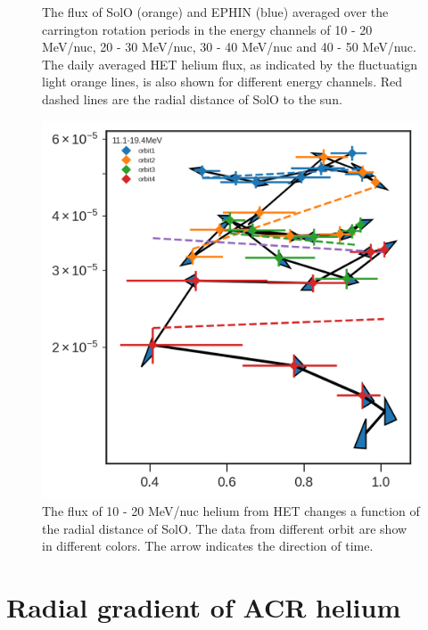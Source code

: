 \begin{figure}
    \caption[The helium flux averaged over the the carrington rotation periods in four energy channels between 10 and 50 MeV/nuc]{The flux of \ac{SolO} (orange) and \ac{EPHIN} (blue) averaged over the carrington rotation periods in the energy channels of 10 - 20 MeV/nuc, 20 - 30 MeV/nuc, 30 - 40 MeV/nuc and 40 - 50 MeV/nuc. The daily averaged \ac{HET} helium flux, as indicated by the fluctuatign light orange lines, is also shown for different energy channels. Red dashed lines are the radial distance of \ac{SolO} to the sun.}
    \label{fig:carrington_flux}
\end{figure}

\begin{figure}
    \centering
    \includegraphics{images/ACR/SOLO-flux_only.png}
    \caption[10 - 20 MeV/nuc \ac{HET} helium flux vs the radial distance of \ac{SolO}]{The flux of 10 - 20 MeV/nuc helium from \ac{HET} changes a function of the radial distance of \ac{SolO}. The data from different orbit are show in different colors. The arrow indicates the direction of time.}
    \label{fig:fluxvsdistance}  
\end{figure}


\section{Radial gradient of ACR helium}

